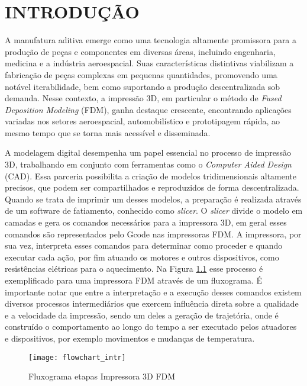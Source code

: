 \chapter{INTRODUÇÃO}
A manufatura aditiva emerge como uma tecnologia altamente promissora para a produção de peças e componentes em diversas áreas, incluindo engenharia, medicina e a indústria aeroespacial. Suas características distintivas viabilizam a fabricação de peças complexas em pequenas quantidades, promovendo uma notável iterabilidade, bem como suportando a produção descentralizada sob demanda. Nesse contexto, a impressão 3D, em particular o método de \textit{Fused Deposition Modeling} (FDM), ganha destaque crescente, encontrando aplicações variadas nos setores aeroespacial, automobilístico e prototipagem rápida, ao mesmo tempo que se torna mais acessível e disseminada.

A modelagem digital desempenha um papel essencial no processo de impressão 3D, trabalhando em conjunto com ferramentas como o \textit{Computer Aided Design} (CAD). Essa parceria possibilita a criação de modelos tridimensionais altamente precisos, que podem ser compartilhados e reproduzidos de forma descentralizada. Quando se trata de imprimir um desses modelos, a preparação é realizada através de um software de fatiamento, conhecido como \textit{slicer}. O \textit{slicer} divide o modelo em camadas e gera os comandos necessários para a impressora 3D, em geral esses comandos são representados pelo Gcode nas impressoras FDM. A impressora, por sua vez, interpreta esses comandos para determinar como proceder e quando executar cada ação, por fim atuando os motores e outros dispositivos, como resistências elétricas para o aquecimento. Na Figura \ref{fig:flowchart_intr} esse processo é exemplificado para uma impressora FDM através de um fluxograma. É importante notar que entre a interpretação e a execução desses comandos existem diversos processos intermediários que exercem influência direta sobre a qualidade e a velocidade da impressão, sendo um deles a geração de trajetória, onde é construído o comportamento ao longo do tempo a ser executado pelos atuadores e dispositivos, por exemplo movimentos e mudanças de temperatura.

\begin{figure}[H]
    \begin{center}
        \caption{Fluxograma etapas Impressora 3D FDM}
        \texttt{[image: flowchart\_intr]}

        \label{fig:flowchart_intr}
    \end{center}
\end{figure}

